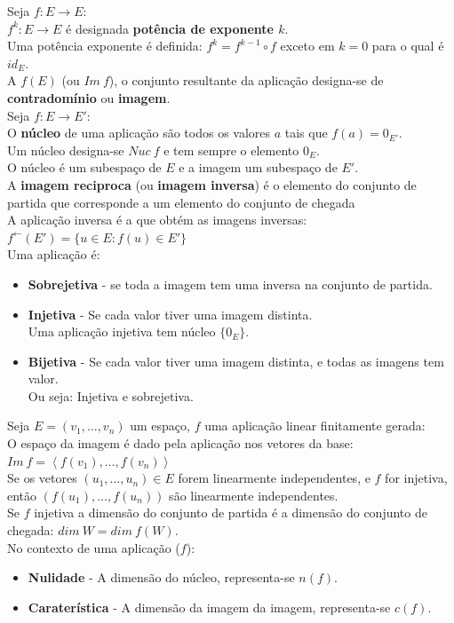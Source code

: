 \documentclass[]{report}
\begin{document}
Seja $f:E \to E$:\\
$f^k: E \to E$ é designada \textbf{potência de exponente $k$}.\\
Uma potência exponente é definida: $f^k = f^{k-1} \circ f$ exceto em $k=0$ para o qual é $id_E$.\\
A $f(E)$ (ou $Im \> f$), o conjunto resultante da aplicação designa-se de \textbf{contradomínio} ou \textbf{imagem}.\\[2mm]
Seja $f:E \to E'$:\\
O \textbf{núcleo} de uma aplicação são todos os valores $a$ tais que $f(a) = 0_{E'}$.\\
Um núcleo designa-se $Nuc \> f$ e tem sempre o elemento $0_E$.\\
O núcleo é um subespaço de $E$ e a imagem um subespaço de $E'$.\\[2mm]
A \textbf{imagem reciproca} (ou \textbf{imagem inversa}) é o elemento do conjunto de partida que corresponde a um elemento do conjunto de chegada\\
A aplicação inversa é a que obtém as imagens inversas: $f^{\leftarrow}(E') = \{u \in E : f(u) \in E'\}$\\[5mm]
Uma aplicação é:
\begin{itemize}
\item \textbf{Sobrejetiva} - se toda a imagem tem uma inversa na conjunto de partida.
\item \textbf{Injetiva} - Se cada valor tiver uma imagem distinta.\\
Uma aplicação injetiva tem núcleo $\{0_E\}$.
\item \textbf{Bijetiva} - Se cada valor tiver uma imagem distinta, e todas as imagens tem valor.\\
Ou seja: Injetiva e sobrejetiva.
\end{itemize}
Seja $E=(v_1, \dots, v_n)$ um espaço, $f$ uma aplicação linear finitamente gerada:\\
O espaço da imagem é dado pela aplicação nos vetores da base: $Im \> f = \left\langle f(v_1), \dots, f(v_n) \right\rangle$\\
Se os vetores $(u_1, \dots, u_n) \in E$ forem linearmente independentes, e $f$ for injetiva, então $(f(u_1), \dots, f(u_n))$ são linearmente independentes.\\
Se $f$ injetiva a dimensão do conjunto de partida é a dimensão do conjunto de chegada: $dim\> W = dim\> f(W)$.\\[2mm]
No contexto de uma aplicação ($f$):
\begin{itemize}
\item \textbf{Nulidade} - A dimensão do núcleo, representa-se $n(f)$.
\item \textbf{Caraterística} - A dimensão da imagem da imagem, representa-se $c(f)$.
\end{itemize}
\end{document}
